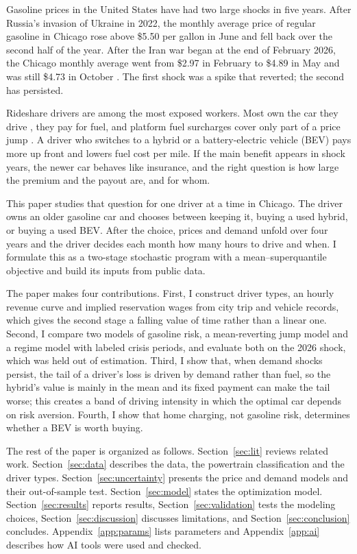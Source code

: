 \documentclass[11pt]{article}
\begin{document}
Gasoline prices in the United States have had two large shocks in five years. After Russia's invasion of Ukraine in 2022, the monthly average price of regular gasoline in Chicago rose above \$5.50 per gallon in June and fell back over the second half of the year. After the Iran war began at the end of February 2026, the Chicago monthly average went from \$2.97 in February to \$4.89 in May and was still \$4.73 in October \citep{eia2026,aljazeera2026,uchicago2026}. The first shock was a spike that reverted; the second has persisted.

Rideshare drivers are among the most exposed workers. Most own the car they drive \citep{seattle2016}, they pay for fuel, and platform fuel surcharges cover only part of a price jump \citep{uber2022}. A driver who switches to a hybrid or a battery-electric vehicle (BEV) pays more up front and lowers fuel cost per mile. If the main benefit appears in shock years, the newer car behaves like insurance, and the right question is how large the premium and the payout are, and for whom.

This paper studies that question for one driver at a time in Chicago. The driver owns an older gasoline car and chooses between keeping it, buying a used hybrid, or buying a used BEV. After the choice, prices and demand unfold over four years and the driver decides each month how many hours to drive and when. I formulate this as a two-stage stochastic program with a mean--superquantile objective \citep{rockafellar2000,rockafellar2002,royset2021} and build its inputs from public data.

The paper makes four contributions. First, I construct driver types, an hourly revenue curve and implied reservation wages from city trip and vehicle records, which gives the second stage a falling value of time rather than a linear one. Second, I compare two models of gasoline risk, a mean-reverting jump model and a regime model with labeled crisis periods, and evaluate both on the 2026 shock, which was held out of estimation. Third, I show that, when demand shocks persist, the tail of a driver's loss is driven by demand rather than fuel, so the hybrid's value is mainly in the mean and its fixed payment can make the tail worse; this creates a band of driving intensity in which the optimal car depends on risk aversion. Fourth, I show that home charging, not gasoline risk, determines whether a BEV is worth buying.

The rest of the paper is organized as follows. Section~\ref{sec:lit} reviews related work. Section~\ref{sec:data} describes the data, the powertrain classification and the driver types. Section~\ref{sec:uncertainty} presents the price and demand models and their out-of-sample test. Section~\ref{sec:model} states the optimization model. Section~\ref{sec:results} reports results, Section~\ref{sec:validation} tests the modeling choices, Section~\ref{sec:discussion} discusses limitations, and Section~\ref{sec:conclusion} concludes. Appendix~\ref{app:params} lists parameters and Appendix~\ref{app:ai} describes how AI tools were used and checked.
\end{document}

